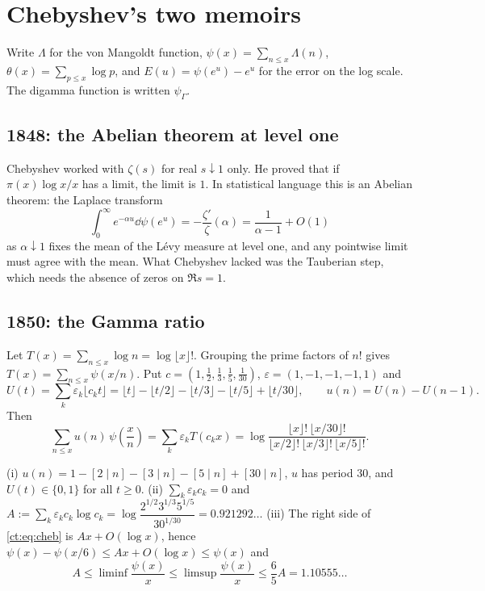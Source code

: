 \section{Chebyshev's two memoirs}\label{ct:sec:memoirs}

Write $\Lambda$ for the von Mangoldt function, $\psi(x)=\sum_{n\le x}\Lambda(n)$, $\theta(x)=\sum_{p\le x}\log p$, and $E(u)=\psi(e^{u})-e^{u}$ for the error on the log scale. The digamma function is written $\psi_\Gamma$.

\subsection{1848: the Abelian theorem at level one}
Chebyshev worked with $\zeta(s)$ for real $s\downarrow1$ only. He proved that if $\pi(x)\log x/x$ has a limit, the limit is $1$. In statistical language this is an Abelian theorem: the Laplace transform
\[
\int_0^\infty e^{-\alpha u}\dd\psi(e^{u})=-\frac{\zeta'}{\zeta}(\alpha)=\frac{1}{\alpha-1}+O(1)
\]
as $\alpha\downarrow1$ fixes the mean of the L\'evy measure at level one, and any pointwise limit must agree with the mean. What Chebyshev lacked was the Tauberian step, which needs the absence of zeros on $\Re s=1$.

\subsection{1850: the Gamma ratio}
Let $T(x)=\sum_{n\le x}\log n=\log\lfloor x\rfloor!$. Grouping the prime factors of $n!$ gives $T(x)=\sum_{n\le x}\psi(x/n)$. Put $c=(1,\tfrac12,\tfrac13,\tfrac15,\tfrac1{30})$, $\varepsilon=(1,-1,-1,-1,1)$ and
\[
U(t)=\sum_{k}\varepsilon_k\lfloor c_k t\rfloor
=\lfloor t\rfloor-\lfloor t/2\rfloor-\lfloor t/3\rfloor-\lfloor t/5\rfloor+\lfloor t/30\rfloor,\qquad
u(n)=U(n)-U(n-1).
\]
Then
\begin{equation}\label{ct:eq:cheb}
\sum_{n\le x}u(n)\,\psi\!\left(\frac{x}{n}\right)=\sum_k\varepsilon_k T(c_kx)
=\log\frac{\lfloor x\rfloor!\,\lfloor x/30\rfloor!}{\lfloor x/2\rfloor!\,\lfloor x/3\rfloor!\,\lfloor x/5\rfloor!}.
\end{equation}

\begin{proposition}[Chebyshev 1850]\label{ct:prop:cheb1850}
(i) $u(n)=1-[2\mid n]-[3\mid n]-[5\mid n]+[30\mid n]$, $u$ has period $30$, and $U(t)\in\{0,1\}$ for all $t\ge0$.
(ii) $\sum_k\varepsilon_kc_k=0$ and $A:=\sum_k\varepsilon_kc_k\log c_k=\log\dfrac{2^{1/2}3^{1/3}5^{1/5}}{30^{1/30}}=0.921292\ldots$
(iii) The right side of \eqref{ct:eq:cheb} is $Ax+O(\log x)$, hence $\psi(x)-\psi(x/6)\le Ax+O(\log x)\le\psi(x)$ and
\[
A\le\liminf\frac{\psi(x)}{x}\le\limsup\frac{\psi(x)}{x}\le\frac65A=1.10555\ldots
\]
\end{proposition}

